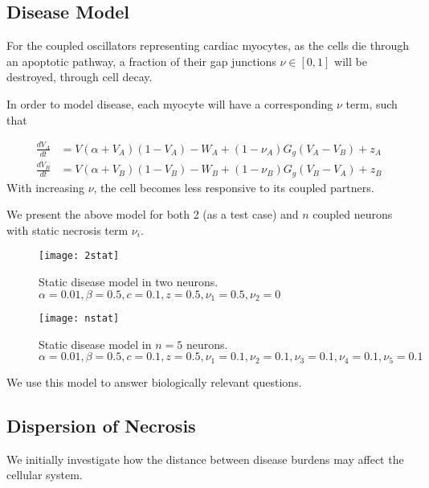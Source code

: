 \documentclass[11pt]{report}
\begin{document}
\subsection{Disease Model} %
\label{sub:disease_model}


For the coupled oscillators representing cardiac myocytes, as the cells die through an apoptotic pathway, a fraction of their gap junctions $\nu \in [0,1]$ will be destroyed, through cell decay.

In order to model disease, each myocyte will have a corresponding $\nu$ term, such that

\begin{align}
\frac{dV_A}{dt} &= V(\alpha +V_A)(1-V_A) -W_A + (1-\nu_A) G_g(V_A-V_B) + z_A\\
\frac{dV_B}{dt} &= V(\alpha +V_B)(1-V_B) -W_B + (1-\nu_B) G_g(V_B-V_A) +z_B
\end{align}
With increasing $\nu$, the cell becomes less responsive to its coupled partners.

We present the above model for both 2 (as a test case) and $n$ coupled neurons with static necrosis term $\nu_i$.

\begin{figure}[!ht]
  \caption{Static disease model in two neurons. $\alpha = 0.01, \beta = 0.5,c = 0.1,z = 0.5, \nu_1 = 0.5, \nu_2 = 0$ }
  \centering
    \texttt{[image: 2stat]}
\end{figure}


\begin{figure}[!ht]
  \caption{Static disease model in $n=5$ neurons. $\alpha = 0.01, \beta = 0.5,c = 0.1,z = 0.5, \nu_1 = 0.1, \nu_2 = 0.1, \nu_3 = 0.1, \nu_4 = 0.1, \nu_5 = 0.1$ }
  \centering
    \texttt{[image: nstat]}
\end{figure}


We use this model to answer biologically relevant questions. 


\subsection{Dispersion of Necrosis} %
\label{sub:dispersion_of_necrosis}


We initially investigate how the distance between disease burdens may affect the cellular system.
\end{document}
